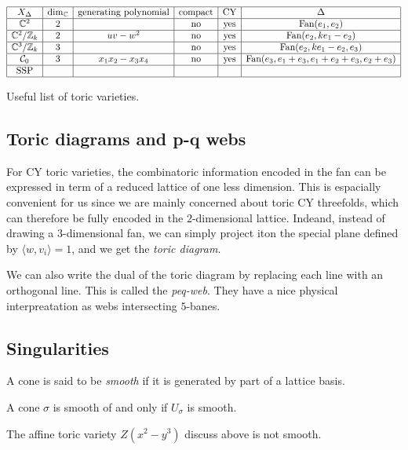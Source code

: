         \begin{table}[H]
            \centering
            $
            \begin{array}{|c|c|c|c|c|c|}
                \hline
                X_\Delta & \dim_{\mathbb{C}} & \text{generating polynomial} & \text{compact} & \text{CY} & \Delta \\ \hline
                \mathbb{C}^2 & 2 & & \text{no} & \text{yes} & \text{Fan}(e_1,e_2) \\ \hline
                \mathbb{C}^2/\mathbb{Z}_k & 2 & uv-w^2 & \text{no} & \text{yes} & \text{Fan}(e_2,ke_1-e_2) \\ \hline
                \mathbb{C}^3/\mathbb{Z}_k & 3 &  & \text{no} & \text{yes} & \text{Fan}(e_2,ke_1-e_2,e_3) \\ \hline
                \mathcal{C}_0 & 3 & x_1x_2-x_3x_4 & \text{no} & \text{yes} & \text{Fan}(e_3,e_1+e_3,e_1+e_2+e_3,e_2+e_3) \\ \hline
                \text{SSP} & & & & & \\ \hline
            \end{array}
            $
            \caption{Useful list of toric varieties.}
        \end{table}

    \subsection{Toric diagrams and p-q webs}

        For CY toric varieties, the combinatoric information encoded in the fan can be expressed in term of a reduced lattice of one less dimension. This is espacially convenient for us since we are mainly concerned about toric CY threefolds, which can therefore be fully encoded in the $2$-dimensional lattice. Indeand, instead of drawing a $3$-dimensional fan, we can simply project iton the special plane defined by $\langle w,v_i\rangle=1$, and we get the \emph{toric diagram}.

        We can also write the dual of the toric diagram by replacing each line with an orthogonal line. This is called the \emph{peq-web}. They have a nice physical interpreatation as webs intersecting $5$-banes.

    \subsection{Singularities}

        A cone is said to be \emph{smooth} if it is generated by part of a lattice basis.
        \begin{theorem*}
            A cone $\sigma$ is smooth of and only if $U_\sigma$ is smooth.
        \end{theorem*}
        \begin{examp*}
            The affine toric variety $Z(x^2-y^3)$ discuss above is not smooth.
        \end{examp*}

